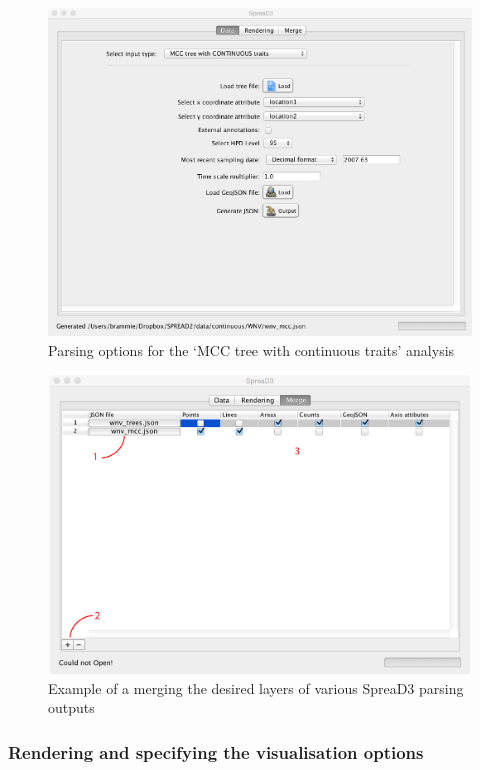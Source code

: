 \documentclass[english]{paper}
\begin{document}
\begin{figure}[!H]
\centering
\includegraphics[width=1\textwidth]{./figures/Fig_parseTrees_mcc.pdf} 
\caption{Parsing options for the `MCC tree with continuous traits' analysis}
\label{fig:renderPosteriorMCC}
\end{figure}

\begin{figure}[!H]
\centering
\includegraphics[width=1\textwidth]{./figures/Fig_mergeWNV.pdf} 
\caption{Example of a merging the desired layers of various SpreaD3 parsing outputs}
\label{fig:mergeTimeSlice}
\end{figure}


\subsubsection{Rendering and specifying the visualisation options}
\end{document}
